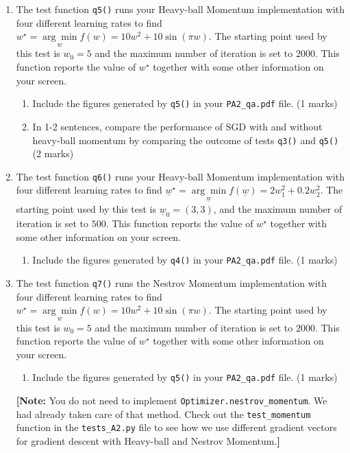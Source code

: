 \documentclass{article}
\theoremstyle{definition}
\begin{document}
\begin{enumerate}[label=\ref{mom}.\alph*)]
	\item The test function \verb|q5()| runs your Heavy-ball Momentum implementation with four different learning rates to find $w^\star = \underset{w}{\arg \min} f(w) = 10w^2 + 10\sin(\pi w)$. The starting point used by this test is $w_0=5$ and the maximum number of iteration is set to $2000$. This function reports the value of $w^\star$ together with some other information on your screen.
	\begin{enumerate}[label=1.2.a.\roman*)]
		\item Include the figures generated by \verb|q5()| in your \verb|PA2_qa.pdf| file. (1 marks)
		\item In 1-2 sentences, compare the performance of SGD with and without heavy-ball momentum by comparing the outcome of tests \verb|q3()| and \verb|q5()| (2 marks)
	\end{enumerate}
	\item The test function \verb|q6()| runs your Heavy-ball Momentum implementation with four different learning rates to find $\underline{w}^\star = \underset{\underline{w}}{\arg \min} f(\underline{w}) = 2w_1^2 + 0.2w_2^2$. The starting point used by this test is $\underline{w}_0=(3,3)$, and the maximum number of iteration is set to $500$. This function reports the value of $w^\star$ together with some other information on your screen.
	\begin{enumerate}[label=1.2.b.\roman*)]
		\item Include the figures generated by \verb|q4()| in your \verb|PA2_qa.pdf| file. (1 marks)
	\end{enumerate}
	\item The test function \verb|q7()| runs the Nestrov Momentum implementation with four different learning rates to find $w^\star = \underset{w}{\arg \min} f(w) = 10w^2 + 10\sin(\pi w)$. The starting point used by this test is $w_0=5$ and the maximum number of iteration is set to $2000$. This function reports the value of $w^\star$ together with some other information on your screen.
	\begin{enumerate}[label=1.2.c.\roman*)]
		\item Include the figures generated by \verb|q5()| in your \verb|PA2_qa.pdf| file. (1 marks)
	\end{enumerate}
	\textbf{[Note:} You do not need to implement \verb|Optimizer.nestrov_momentum|. We had already taken care of that method. Check out the \verb|test_momentum| function in the \verb|tests_A2.py| file to see how we use different gradient vectors for gradient descent with Heavy-ball and Nestrov Momentum.\textbf{]}

\end{enumerate}
\end{document}
